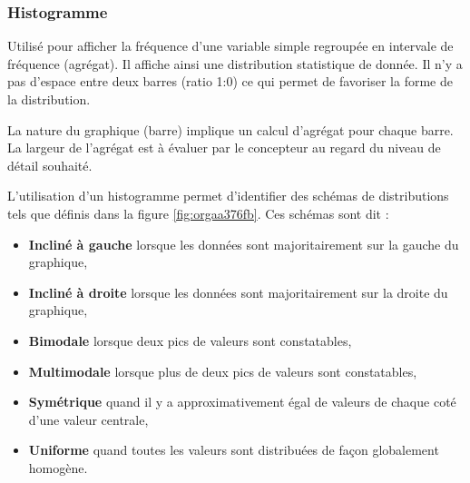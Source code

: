 \documentclass[a4paper,12pt]{article}
\begin{document}
\begin{multicols}{2}
\subsubsection*{Histogramme}
\label{sec:orgeb37bde}
Utilisé pour afficher la fréquence d'une variable simple regroupée en intervale de fréquence (agrégat).\autocite{sosulskiGraphics2019} Il affiche ainsi une distribution statistique de donnée. Il n'y a pas d'espace entre deux barres (ratio 1:0) ce qui permet de favoriser la forme de la distribution. \autocite{alansmithLexiqueVisuel}

La nature du graphique (barre) implique un calcul d'agrégat pour chaque barre. \autocite{wilkeVisualizingDistributionsHistograms2019} La largeur de l'agrégat est à évaluer par le concepteur au regard du niveau de détail souhaité.\autocite{wilkeVisualizingDistributionsHistograms2019}

L'utilisation d'un histogramme permet d'identifier des schémas de distributions tels que définis dans la figure \ref{fig:orgaa376fb}. \autocite{jonathanschwabishDistribution2021}
Ces schémas sont dit :
\begin{itemize}
\item \textbf{Incliné à gauche} lorsque les données sont majoritairement sur la gauche du graphique,
\item \textbf{Incliné à droite} lorsque les données sont majoritairement sur la droite du graphique,
\item \textbf{Bimodale} lorsque deux pics de valeurs sont constatables,
\item \textbf{Multimodale} lorsque plus de deux pics de valeurs sont constatables,
\item \textbf{Symétrique} quand il y a approximativement égal de valeurs de chaque coté d'une valeur centrale,
\item \textbf{Uniforme} quand toutes les valeurs sont distribuées de façon globalement homogène.
\end{itemize}


\end{multicols}
\end{document}
